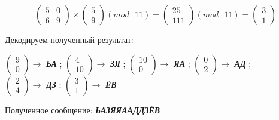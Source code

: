 \documentclass[a5paper, 10pt]{article}
\theoremstyle{definition}
\theoremstyle{plain}
\theoremstyle{remark}
\begin{document}
\begin{equation}
\begin{pmatrix}
 5 & 0\\
 6 & 9
\end{pmatrix}
 \times
\begin{pmatrix}
 5\\
9
\end{pmatrix}
(mod \text{ }11)
= 
\begin{pmatrix}
 25\\
111
\end{pmatrix}
(mod \text{ }11)
= \begin{pmatrix}
 3\\
1
\end{pmatrix}
\end{equation}

Декодируем полученный результат:
\begin{center}
 $ \begin{pmatrix}
 9\\
0
\end{pmatrix} \to$ \textbf{\textit{ЬА}} ;
 $ \begin{pmatrix}
 4\\
10
\end{pmatrix} \to$ \textbf{\textit{ЗЯ}} ;
 $ \begin{pmatrix}
 10\\
0
\end{pmatrix} \to$ \textbf{\textit{ЯА}} ;
 $ \begin{pmatrix}
 0\\
2
\end{pmatrix} \to$ \textbf{\textit{АД}} ; \\
 $ \begin{pmatrix}
 2\\
4
\end{pmatrix} \to$ \textbf{\textit{ДЗ}} ;
$\begin{pmatrix}
 3\\
1
\end{pmatrix} \to$ \textbf{\textit{ЁВ}}  \\
\end{center}
Полученное сообщение:  \textbf{\textit{ЬАЗЯЯААДДЗЁВ}}
\end{document}
